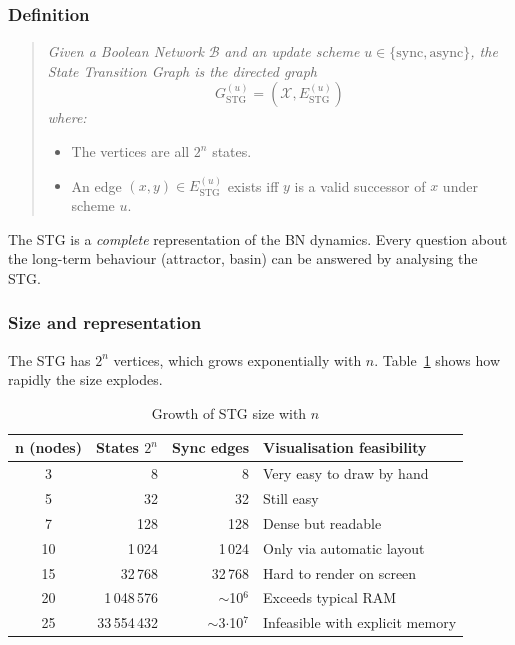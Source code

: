 \documentclass[oneside,final]{hcmut-report}
\begin{document}
\subsubsection{Definition}

\begin{quote}
\textit{Given a Boolean Network} $\mathcal{B}$ \textit{and an update scheme} $u \in \{\text{sync}, \text{async}\}$\textit{, the State Transition Graph is the directed graph}
$$G_{\text{STG}}^{(u)} = (\mathcal{X}, E_{\text{STG}}^{(u)})$$
\textit{where:}
\begin{itemize}[leftmargin=*]
    \item The vertices are all $2^n$ states.
    \item An edge $(x, y) \in E_{\text{STG}}^{(u)}$ exists iff $y$ is a valid successor of $x$ under scheme $u$.
\end{itemize}
\end{quote}

The STG is a \textit{complete} representation of the BN dynamics. Every question about the long-term behaviour (attractor, basin) can be answered by analysing the STG.

\subsubsection{Size and representation}

The STG has $2^n$ vertices, which grows exponentially with $n$. Table~\ref{tab:stg-size} shows how rapidly the size explodes.

\begin{table}[H]
    \centering
    \renewcommand{\arraystretch}{1.3}
    \begin{tabular}{|c|r|r|p{}|}
        \hline
        \rowcolor{bklight}
        \textbf{n (nodes)} & \textbf{States $2^n$} & \textbf{Sync edges} & \textbf{Visualisation feasibility} \\
        \hline
        3  & 8         & 8        & Very easy to draw by hand \\
        5  & 32        & 32       & Still easy \\
        7  & 128       & 128      & Dense but readable \\
        10 & 1\,024     & 1\,024    & Only via automatic layout \\
        15 & 32\,768    & 32\,768   & Hard to render on screen \\
        20 & 1\,048\,576 & $\sim$10$^6$ & Exceeds typical RAM \\
        25 & 33\,554\,432 & $\sim$3$\cdot$10$^7$ & Infeasible with explicit memory \\
        \hline
    \end{tabular}
    \caption{Growth of STG size with $n$}
    \label{tab:stg-size}
\end{table}
\end{document}
